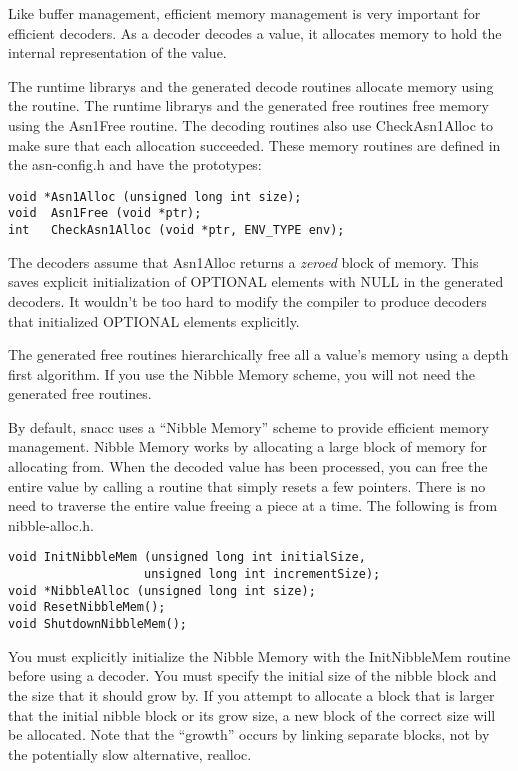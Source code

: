 Like buffer management, efficient memory management is very important
for efficient decoders.  As a decoder decodes a value, it allocates
memory to hold the internal representation of the value.

The runtime librarys and the generated decode routines allocate memory
using the routine. The runtime librarys
and the generated free routines free memory using the {\C Asn1Free}
routine.  The decoding routines also use {\C CheckAsn1Alloc} to make
sure that each allocation succeeded.  These memory routines are defined
in the
{\ufn asn-config.h} and have the prototypes:
\begin{verbatim}
void *Asn1Alloc (unsigned long int size);
void  Asn1Free (void *ptr);
int   CheckAsn1Alloc (void *ptr, ENV_TYPE env);
\end{verbatim}

The decoders assume that {\C Asn1Alloc} returns a \emph{zeroed} block
of memory.  This saves explicit initialization of OPTIONAL elements with
NULL in the generated decoders.  It wouldn't be too hard to modify the
compiler to produce decoders that initialized OPTIONAL elements
explicitly.

The generated free routines hierarchically free all a value's
memory using a depth first algorithm.  If you use the Nibble Memory
scheme, you will not need the generated free routines.

By default, snacc uses a ``Nibble Memory'' scheme to provide efficient
memory management.  Nibble Memory works by allocating a large block of
memory for allocating from.  When the decoded value has been
processed, you can free the entire value by calling a routine that
simply resets a few pointers.  There is no need to traverse the entire
value freeing a piece at a time.  The following is from
{\ufn nibble-alloc.h}.
\begin{verbatim}
void InitNibbleMem (unsigned long int initialSize,
                   unsigned long int incrementSize);
void *NibbleAlloc (unsigned long int size);
void ResetNibbleMem();
void ShutdownNibbleMem();
\end{verbatim}

You must explicitly initialize the Nibble Memory with the
{\C InitNibbleMem} routine before using a decoder.  You must specify
the initial size of the nibble block and the size that it should grow
by.  If you attempt to allocate a block that is larger that the
initial nibble block or its grow size, a new block of the correct size
will be allocated.  Note that the ``growth'' occurs by linking
separate blocks, not by the potentially slow alternative,
{\C realloc}.

